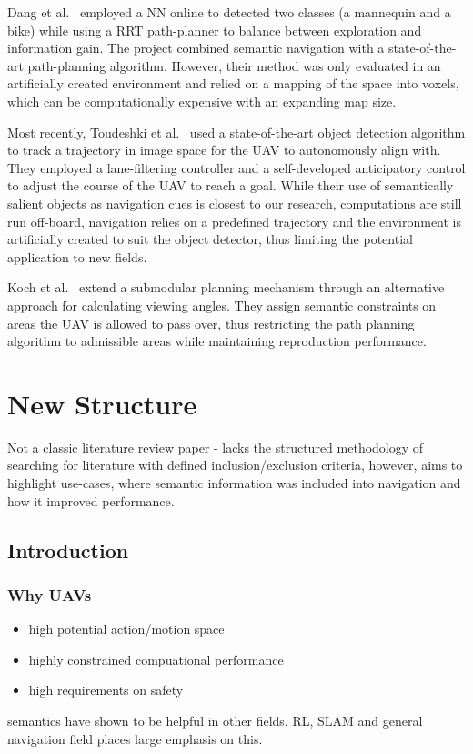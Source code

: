 \documentclass[a4paper,12pt]{article}
\theoremstyle{mytheor}
\begin{document}
Dang et al.~\cite{dang_autonomous_2018} employed a NN online to detected two classes (a mannequin and a bike) while using a RRT path-planner to balance between exploration and information gain. The project combined semantic navigation with a state-of-the-art path-planning algorithm. However, their method was only evaluated in an artificially created environment and relied on a mapping of the space into voxels, which can be computationally expensive with an expanding map size.

Most recently, Toudeshki et al.~\cite{toudeshki_robust_2018} used a state-of-the-art object detection algorithm to track a trajectory in image space for the UAV to autonomously align with. They employed a lane-filtering controller and a self-developed anticipatory control to adjust the course of the UAV to reach a goal. While their use of semantically salient objects as navigation cues is closest to our research, computations are still run off-board, navigation relies on a predefined trajectory and the environment is artificially created to suit the object detector, thus limiting the potential application to new fields.

Koch et al.~\cite{koch_automatic_2019} extend a submodular planning mechanism through an alternative approach for calculating viewing angles. They assign semantic constraints on areas the UAV is allowed to pass over, thus restricting the path planning algorithm to admissible areas while maintaining reproduction performance. 

\section{New Structure}
Not a classic literature review paper - lacks the structured methodology of searching for literature with defined inclusion/exclusion criteria, however, aims to highlight use-cases, where semantic information was included into navigation and how it improved performance.
\subsection{Introduction}
\subsubsection{Why UAVs}
\begin{itemize}
    \item high potential action/motion space 
    \item highly constrained compuational performance
    \item high requirements on safety
\end{itemize}
semantics have shown to be helpful in other fields. RL, SLAM and general navigation field places large emphasis on this.  
\end{document}
